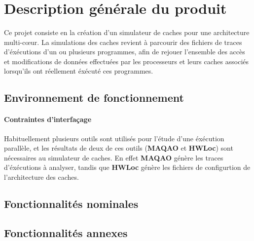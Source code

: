 \section{Description générale du produit}

\paragraph{}
Ce projet consiste en la création d'un simulateur de caches pour une architecture multi-c\oe ur. La simulations des caches revient à parcourir des fichiers de traces d'éxécutions d'un ou plusieurs programmes, afin de rejouer l'ensemble des accès et modifications de données effectuées par les processeurs et leurs caches associés lorsqu'ils ont réellement éxécuté ces programmes.

\subsection{Environnement de fonctionnement}

\paragraph{Contraintes d'interfaçage}
Habituellement plusieurs outils sont utilisés pour l'étude d'une éxécution parallèle, et les résultats de deux de ces outils (\textbf{MAQAO} et \textbf{HWLoc}) sont nécessaires au simulateur de caches. En effet \textbf{MAQAO} génère les traces d'éxécutions à analyser, tandis que \textbf{HWLoc}
génère les fichiers de configurtion de l'architecture des caches.

\subsection{Fonctionnalités nominales}

\subsection{Fonctionnalités annexes}
